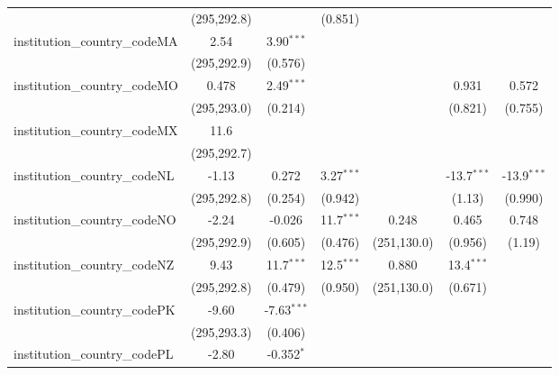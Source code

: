 \begin{tabular}{lcccccc}
                                         & (295,292.8)   &               & (0.851)       &               &               &   \\   
   institution\_country\_codeMA          & 2.54          & 3.90$^{***}$  &               &               &               &   \\   
                                         & (295,292.9)   & (0.576)       &               &               &               &   \\   
   institution\_country\_codeMO          & 0.478         & 2.49$^{***}$  &               &               & 0.931         & 0.572\\   
                                         & (295,293.0)   & (0.214)       &               &               & (0.821)       & (0.755)\\   
   institution\_country\_codeMX          & 11.6          &               &               &               &               &   \\   
                                         & (295,292.7)   &               &               &               &               &   \\   
   institution\_country\_codeNL          & -1.13         & 0.272         & 3.27$^{***}$  &               & -13.7$^{***}$ & -13.9$^{***}$\\   
                                         & (295,292.8)   & (0.254)       & (0.942)       &               & (1.13)        & (0.990)\\   
   institution\_country\_codeNO          & -2.24         & -0.026        & 11.7$^{***}$  & 0.248         & 0.465         & 0.748\\   
                                         & (295,292.9)   & (0.605)       & (0.476)       & (251,130.0)   & (0.956)       & (1.19)\\   
   institution\_country\_codeNZ          & 9.43          & 11.7$^{***}$  & 12.5$^{***}$  & 0.880         & 13.4$^{***}$  &   \\   
                                         & (295,292.8)   & (0.479)       & (0.950)       & (251,130.0)   & (0.671)       &   \\   
   institution\_country\_codePK          & -9.60         & -7.63$^{***}$ &               &               &               &   \\   
                                         & (295,293.3)   & (0.406)       &               &               &               &   \\   
   institution\_country\_codePL          & -2.80         & -0.352$^{*}$  &               &               &               &   \\   

\end{tabular}
